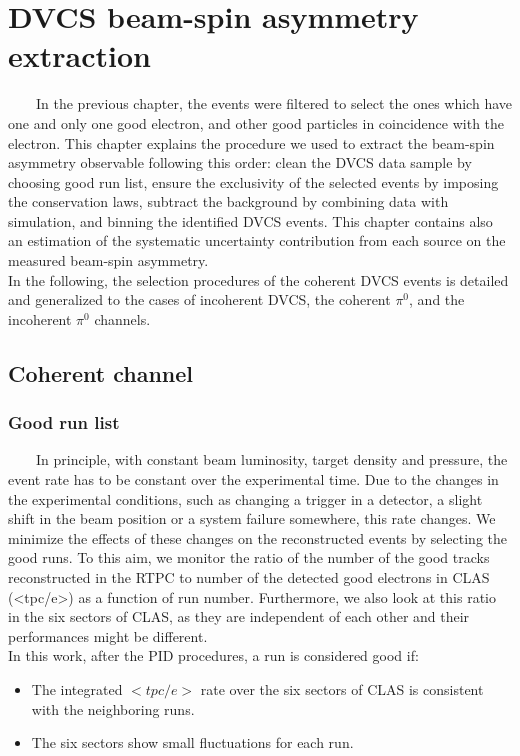 \chapter{DVCS beam-spin asymmetry extraction}

~~~~In the previous chapter, the events were filtered to select the ones which have one and only one good electron, and other good particles in coincidence with the electron. This chapter explains the procedure we used to extract the beam-spin asymmetry observable following this order: clean the DVCS data sample by choosing good run list, ensure the exclusivity of the selected events by imposing the conservation laws, subtract the background by combining data with simulation, and binning the identified DVCS events. This chapter contains also an estimation of the systematic uncertainty contribution from each source on the measured beam-spin asymmetry.\\

In the following, the selection procedures of the coherent DVCS events is detailed and generalized to the cases of incoherent DVCS, the coherent $\pi^{0}$, and the incoherent $\pi^{0}$ channels.    
  
\section{Coherent channel}
\subsection{Good run list}
~~~~In principle, with constant beam luminosity, target density and pressure, the event rate has to be constant over the experimental time. Due to the changes in the experimental conditions, such as changing a trigger in a detector, a slight shift in the beam position or a system failure somewhere, this rate changes. We minimize the effects of these changes on the reconstructed events by selecting the good runs. To this aim, we monitor the ratio of the number of the good tracks reconstructed in the RTPC to number of the detected good electrons in CLAS (<tpc/e>) as a function of run number. Furthermore, we also look at this ratio in the six sectors of CLAS, as they are independent of each other and their performances might be different. \\

In this work, after the PID procedures, a run is considered good if:
\begin{itemize}
\item The integrated $<tpc/e>$ rate over the six sectors of CLAS is consistent with the neighboring runs.
\item The six sectors show small fluctuations for each run. 
\end{itemize}    

